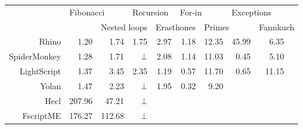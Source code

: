\begin{tabular}{r|r|r|r|r|r|r|r|r|r}
& \multicolumn{2}{|l|}{Fibonacci} & \multicolumn{2}{|l|}{Recursion} & \multicolumn{2}{|l|}{For-in} & \multicolumn{2}{|l|}{Exceptions} & \\
& & \multicolumn{2}{|l|}{Nested loops} & \multicolumn{2}{|l|}{Erasthones} & \multicolumn{2}{|l|}{Primes} & \multicolumn{2}{|l}{Fannkuch} \\
Rhino       & 1.20 & 1.74 & 1.75   & 2.97 & 1.18 & 12.35 & 45.99 & 6.35 & \\ 
SpiderMonkey& 1.28 & 1.71 & $\bot$ & 2.08 & 1.14 & 11.03 & 0.45  & 5.10 & \\ 
LightScript & 1.37 & 3.45 & 2.35   & 1.19 & 0.57 & 11.70 & 0.65  & 11.15 & \\
Yolan       & 1.47 & 2.23 & $\bot$ & 1.95 & 0.32 &  9.20 &  &  \\
Hecl      & 207.96 & 47.21 & $\bot$ & & & & &  & \\ 
FscriptME & 176.27 & 112.68& $\bot$ & & & & &  & \\ 
\end{tabular}
